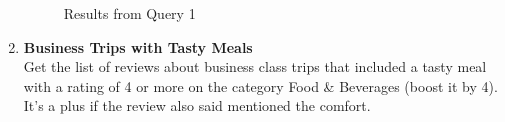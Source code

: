 \documentclass{Configuration_Files/PoliMi3i_thesis}
\begin{document}
\begin{enumerate}
\begin{figure}[H]
    \centering
    \quad
    \label{fig:quadtree2}
    \caption{Results from Query 1}

\end{figure}
\newpage

    \item \textbf{Business Trips with Tasty Meals} \\ 
    Get the list of reviews about business class trips that included a tasty meal with a rating of 4 or more on the category Food \& Beverages (boost it by 4). It's a plus if the review also said mentioned the comfort.



\end{enumerate}
\end{document}
